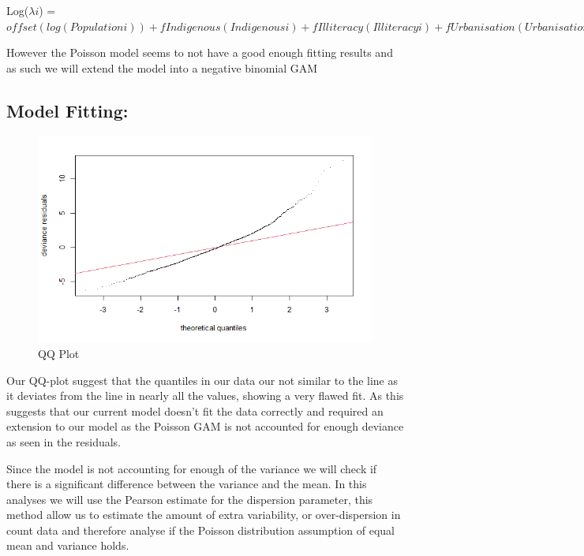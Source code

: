 \documentclass[
  letterpaper,
  DIV=11,
  numbers=noendperiod]{scrartcl}
\begin{document}
Log(\(\lambda i\)) =
\(offset(log(Populationi))+fIndigenous(Indigenousi)+fIlliteracy(Illiteracyi)+fUrbanisation(Urbanisationi)+fDensity(Densityi)+fPoverty(Povertyi)+fPoor_Sanitation(Poor_Sanitationi)+fUnemployment(Unemploymenti)+fTimeliness(Timelinessi)+fla(lati)+flon(loni)+fYear(Yeari)+flon,lat,Year(loni,lati,Yeari)\)

However the Poisson model seems to not have a good enough fitting
results and as such we will extend the model into a negative binomial
GAM

\hypertarget{model-fitting}{%
\subsection{Model Fitting:}\label{model-fitting}}

\begin{figure}

{\centering \includegraphics{QQ.png}

}

\caption{QQ Plot}

\end{figure}

Our QQ-plot suggest that the quantiles in our data our not similar to
the line as it deviates from the line in nearly all the values, showing
a very flawed fit. As this suggests that our current model doesn't fit
the data correctly and required an extension to our model as the Poisson
GAM is not accounted for enough deviance as seen in the residuals.

Since the model is not accounting for enough of the variance we will
check if there is a significant difference between the variance and the
mean. In this analyses we will use the Pearson estimate for the
dispersion parameter, this method allow us to estimate the amount of
extra variability, or over-dispersion in count data and therefore
analyse if the Poisson distribution assumption of equal mean and
variance holds.
\end{document}

